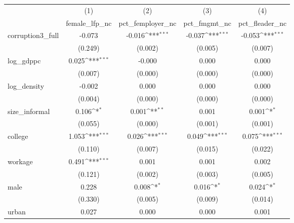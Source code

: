 {
\def\sym#1{\ifmmode^{#1}\else\(^{#1}\)\fi}
\begin{tabular}{l*{4}{c}}
\hline\hline
            &\multicolumn{1}{c}{(1)}&\multicolumn{1}{c}{(2)}&\multicolumn{1}{c}{(3)}&\multicolumn{1}{c}{(4)}\\
            &\multicolumn{1}{c}{female\_lfp\_nc}&\multicolumn{1}{c}{pct\_femployer\_nc}&\multicolumn{1}{c}{pct\_fmgmt\_nc}&\multicolumn{1}{c}{pct\_fleader\_nc}\\
\hline
corruption3\_full&      -0.073         &      -0.016\sym{***}&      -0.037\sym{***}&      -0.053\sym{***}\\
            &     (0.249)         &     (0.002)         &     (0.005)         &     (0.007)         \\
[1em]
log\_gdppc   &       0.025\sym{***}&      -0.000         &       0.000         &       0.000         \\
            &     (0.007)         &     (0.000)         &     (0.000)         &     (0.000)         \\
[1em]
log\_density &      -0.002         &       0.000         &       0.000         &       0.000         \\
            &     (0.004)         &     (0.000)         &     (0.000)         &     (0.000)         \\
[1em]
size\_informal&       0.106\sym{*}  &       0.001\sym{**} &       0.001         &       0.001\sym{*}  \\
            &     (0.055)         &     (0.000)         &     (0.001)         &     (0.001)         \\
[1em]
college     &       1.053\sym{***}&       0.026\sym{***}&       0.049\sym{***}&       0.075\sym{***}\\
            &     (0.110)         &     (0.007)         &     (0.015)         &     (0.022)         \\
[1em]
workage     &       0.491\sym{***}&       0.001         &       0.001         &       0.002         \\
            &     (0.121)         &     (0.002)         &     (0.003)         &     (0.005)         \\
[1em]
male        &       0.228         &       0.008\sym{*}  &       0.016\sym{*}  &       0.024\sym{*}  \\
            &     (0.330)         &     (0.005)         &     (0.009)         &     (0.014)         \\
[1em]
urban       &       0.027         &       0.000         &       0.000         &       0.001         \\

\end{tabular}}

